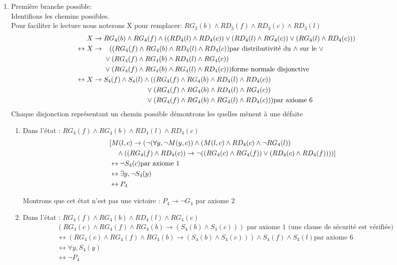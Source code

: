 \documentclass{article}
\begin{document}
\begin{enumerate}
  \item Première branche possible:\\
  Identifions les chemins possibles.\\
  Pour faciliter le lecture nous noterons X  pour remplacer: $ RG_3(b) \wedge RD_3(f) \wedge RD_3(c) \wedge RD_3(l)$
\begin{align*}
       X&\to RG_4(b) \wedge RG_4(f) \wedge ((RD_4(l)\wedge RD_4(c))\vee (RD_4(l)\wedge RG_4(c))\vee(RG_4(l)\wedge RD_4(c)))\\
      \leftrightarrow  X &\to \hphantom{|a} (( RG_4(f) \wedge RG_4(b) \wedge RD_4(l) \wedge RD_4(c))\text{par distributivité du $\wedge$ sur le $\vee$}\\
      & \hphantom{aaa} \vee (RG_4(f) \wedge RG_4(b) \wedge RD_4(l) \wedge RG_4(c))\\
      & \hphantom{aaa} \vee (RG_4(f) \wedge RG_4(b) \wedge RG_4(l) \wedge RD_4(c)))\text{forme normale disjonctive}\\
      \leftrightarrow  X &\to S_4(f) \wedge S_4(l) \wedge (( RG_4(f) \wedge RG_4(b) \wedge RD_4(l) \wedge RD_4(c))\\
      & \hphantom{aaaaaaaaaa|aaaa} \vee (RG_4(f) \wedge RG_4(b) \wedge RD_4(l) \wedge RG_4(c))\\
      & \hphantom{aaaaaaaaaa|aaaa} \vee (RG_4(f) \wedge RG_4(b) \wedge RG_4(l) \wedge RD_4(c)))\text{par axiome 6}\\
\end{align*}
Chaque disjonction représentant un chemin possible démontrons les quelles mènent à une défaite
  \begin{enumerate}
    \item Dans l'état : $RG_4(f) \wedge RG_4(b) \wedge RD_4(l) \wedge RD_4(c)$
    \begin{align*}
      &[M(l,c) \to (\neg(\forall y, \neg M(y,c))\wedge (M(l,c)\wedge RD_4(c)\wedge \neg RG_4(l)) \\
      &\hphantom{aa}  \wedge ((RG_4(f) \wedge RD_4(c))\to \neg ((RG_4(c) \wedge RG_4(f))\vee (RD_4(c)\wedge RD_4(f))))]\\
      &\leftrightarrow \neg S_4(c) \text{par axiome 1}\\
      &\leftrightarrow \exists y,\neg S_4(y)\\
      &\leftrightarrow P_4
    \end{align*}

    Montrons que cet état n'est pas une victoire : $P_4 \to \neg G_4$ par axiome 2
    \item Dans l'état : $RG_4(f) \wedge RG_4(b) \wedge RD_4(l) \wedge RG_4(c)$
    \begin{align*}
      &(RG_4(c)\wedge RG_4(f)\wedge RG_4(b) \to (S_4(b) \wedge S_4(c))) \text{ par axiome 1 (une clause de sécurité est vérifiée)}\\
      &\leftrightarrow (RG_4(c)\wedge RG_4(f)\wedge RG_4(b) \to (S_4(b) \wedge S_4(c))) \wedge S_4(f) \wedge S_4(l)\text{par axiome 6}\\
      &\leftrightarrow \forall y,S_4(y)\\
      &\leftrightarrow \neg P_4
    \end{align*}


\end{enumerate}
\end{enumerate}
\end{document}
